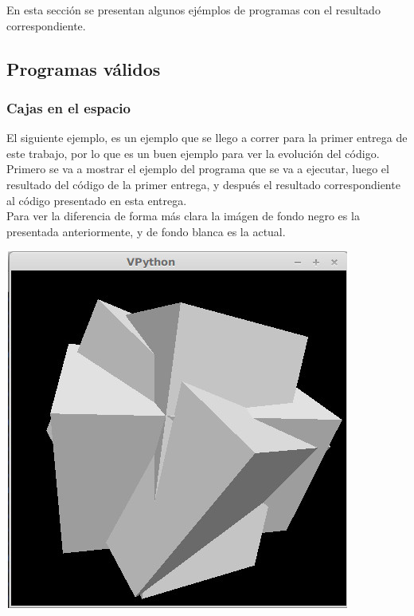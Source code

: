 En esta secci\'on se presentan algunos ej\'emplos de programas con el resultado correspondiente.

\subsection{Programas v\'alidos}

\subsubsection{Cajas en el espacio}
El siguiente ejemplo, es un ejemplo que se llego a correr para la primer entrega de este trabajo, por lo que es un buen ejemplo para ver la evoluci\'on del c\'odigo. \\
Primero se va a mostrar el ejemplo del programa que se va a ejecutar, luego el resultado del c\'odigo de la primer entrega, y despu\'es el resultado correspondiente al c\'odigo presentado en esta entrega.\\
Para ver la diferencia de forma m\'as clara la im\'agen de fondo negro es la presentada anteriormente, y de fondo blanca es la actual.\\




\centerline{\includegraphics[scale=0.40]{../imagenes/eg04.jpg}}



